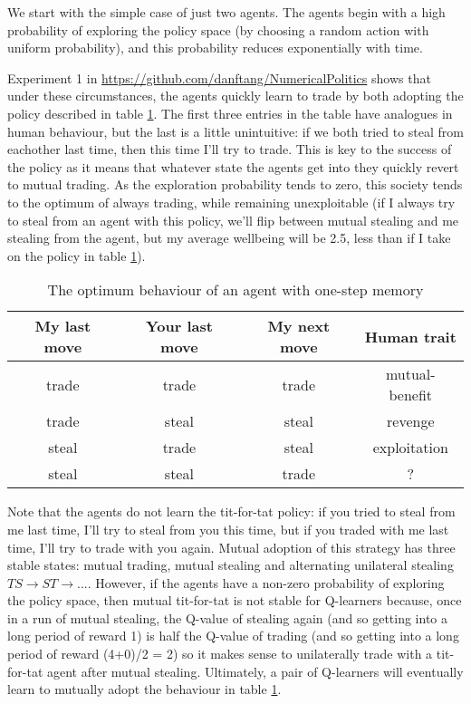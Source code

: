 \documentclass[a4paper]{report}
\begin{document}
We start with the simple case of just two agents. The agents begin with a high probability of exploring the policy space (by choosing a random action with uniform probability), and this probability reduces exponentially with time.

Experiment 1 in \url{https://github.com/danftang/NumericalPolitics} shows that under these circumstances, the agents quickly learn to trade by both adopting the policy described in table \ref{optimalpolicy1}. The first three entries in the table have analogues in human behaviour, but the last is a little unintuitive: if we both tried to steal from eachother last time, then this time I'll try to trade. This is key to the success of the policy as it means that whatever state the agents get into they quickly revert to mutual trading. As the exploration probability tends to zero, this society tends to the optimum of always trading, while remaining unexploitable (if I always try to steal from an agent with this policy, we'll flip between mutual stealing and me stealing from the agent, but my average wellbeing will be 2.5, less than if I take on the policy in table \ref{optimalpolicy1}).


\begin{table}
	\begin{center}
		\begin{tabular}{cccc}
My last move & Your last move & My next move & Human trait\\
\hline
trade & trade &  trade &	 mutual-benefit \\
trade & steal &  steal &	 revenge \\
steal & trade &  steal &	 exploitation \\
steal & steal &  trade &	 ? \\
\hline
\end{tabular}
\end{center}
\caption{The optimum behaviour of an agent with one-step memory}
\label{optimalpolicy1}
\end{table}

Note that the agents do not learn the tit-for-tat policy: if you tried to steal from me last time, I'll try to steal from you this time, but if you traded with me last time, I'll try to trade with you again. Mutual adoption of this strategy has three stable states: mutual trading, mutual stealing and alternating unilateral stealing $TS \rightarrow ST \rightarrow ...$. However, if the agents have a non-zero probability of exploring the policy space, then mutual tit-for-tat is not stable for Q-learners because, once in a run of mutual stealing, the Q-value of stealing again (and so getting into a long period of reward 1) is half the Q-value of trading (and so getting into a long period of reward (4+0)/2 = 2) so it makes sense to unilaterally trade with a tit-for-tat agent after mutual stealing. Ultimately, a pair of Q-learners will eventually learn to mutually adopt the behaviour in table \ref{optimalpolicy1}.
\end{document}
